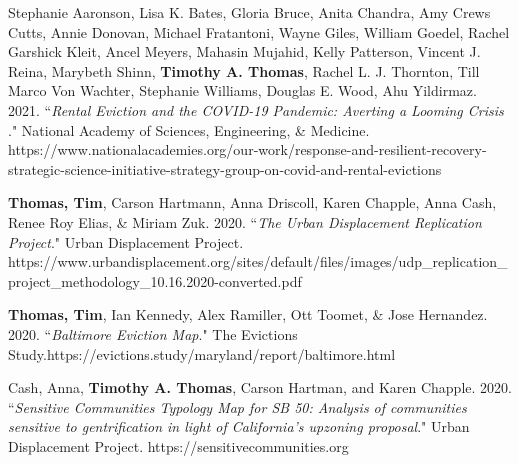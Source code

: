 

\begin{cvparagraph}

Stephanie Aaronson, Lisa K. Bates, Gloria Bruce, Anita Chandra, Amy Crews Cutts, Annie Donovan, Michael Fratantoni, Wayne Giles, William Goedel, Rachel Garshick Kleit, Ancel Meyers, Mahasin Mujahid, Kelly Patterson, Vincent J. Reina, Marybeth Shinn, \textbf{Timothy A. Thomas}, Rachel L. J. Thornton, Till Marco Von Wachter, Stephanie Williams, Douglas E. Wood, Ahu Yildirmaz. 2021. “\emph{Rental Eviction and the COVID-19 Pandemic: Averting a Looming Crisis}
." National Academy of Sciences, Engineering, \& Medicine. https://www.nationalacademies.org/our-work/response-and-resilient-recovery-strategic-science-initiative-strategy-group-on-covid-and-rental-evictions
\end{cvparagraph}

\begin{cvparagraph}

\textbf{Thomas, Tim}, Carson Hartmann, Anna Driscoll, Karen Chapple, Anna Cash, Renee Roy Elias, \& Miriam Zuk. 2020. “\emph{The Urban Displacement Replication Project}." Urban Displacement Project. https://www.urbandisplacement.org/sites/default/files/images/\newline udp\_replication\_project\_methodology\_10.16.2020-converted.pdf
\end{cvparagraph}

\begin{cvparagraph}

\textbf{Thomas, Tim}, Ian Kennedy, Alex Ramiller, Ott Toomet, \& Jose Hernandez. 2020. “\emph{Baltimore Eviction Map}." The Evictions Study.\newline https://evictions.study/maryland/report/baltimore.html
\end{cvparagraph}

\begin{cvparagraph}

Cash, Anna, \textbf{Timothy A. Thomas}, Carson Hartman, and Karen Chapple. 2020. “\emph{Sensitive Communities Typology Map for SB 50: Analysis of communities sensitive to gentrification in light of California's upzoning proposal}." Urban Displacement Project. https://sensitivecommunities.org
\end{cvparagraph}


